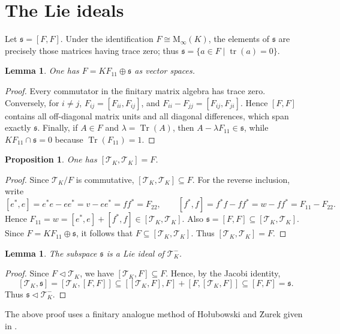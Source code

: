 \documentclass[11pt]{article}
\numberwithin{equation}{section}
\theoremstyle{plain}
\newtheorem{lemma}[theorem]{Lemma}
\newtheorem{proposition}[theorem]{Proposition}
\theoremstyle{definition}
\numberwithin{equation}{section}
\newcommand{\T}{\mathscr T_K}
\newcommand{\tr}{\operatorname{Tr}}
\begin{document}
\section{The Lie ideals}
Let $\mathfrak s=[F,F]$. Under the identification $F\cong\mathrm M_\infty(K)$, the elements of $\mathfrak s$ are precisely those matrices having trace zero; thus $\mathfrak s=\{a\in F\mid \operatorname{tr}(a)=0\}$.

\begin{lemma}\label{lem:s-trace-zero}
One has $F=KF_{11}\oplus\mathfrak s$ as vector spaces.
\end{lemma}

\begin{proof}
Every commutator in the finitary matrix algebra has trace zero. Conversely, for $i\neq j$, $F_{ij}=[F_{ii},F_{ij}]$, and $F_{ii}-F_{jj}=[F_{ij},F_{ji}]$. Hence $[F,F]$ contains all off-diagonal matrix units and all diagonal differences, which span exactly $\mathfrak s$. Finally, if $A\in F$ and $\lambda=\tr(A)$, then $A-\lambda F_{11}\in\mathfrak s$, while $KF_{11}\cap\mathfrak s=0$ because $\tr(F_{11})=1$.
\end{proof}

\begin{proposition}\label{prop:derived}
One has $[\T,\T]=F$.
\end{proposition}

\begin{proof}
Since $\T/F$ is commutative, $[\T,\T]\subseteq F$. For the reverse inclusion, write
$$
[e^*,e]=e^* e-e e^*=v-e e^*=f f^*=F_{22},
\qquad
[f^*,f]=f^* f-f f^*=w-f f^*=F_{11}-F_{22}.
$$
Hence $F_{11}=w=[e^*,e]+[f^*,f]\in[\T,\T]$. Also $\mathfrak s=[F,F]\subseteq[\T,\T]$. Since $F=KF_{11}\oplus\mathfrak s$, it follows that $F\subseteq[\T,\T]$. Thus $[\T,\T]=F$.
\end{proof}



\begin{lemma}\label{lem:s-ideal}
The subspace $\mathfrak s$ is a Lie ideal of $\T^-$.
\end{lemma}

\begin{proof}
Since $F\triangleleft\T$, we have $[\T,F]\subseteq F$. Hence, by the Jacobi identity,
$$
[\T,\mathfrak s]=[\T,[F,F]]
\subseteq [[\T,F],F]+[F,[\T,F]]
\subseteq [F,F]=\mathfrak s.
$$
Thus $\mathfrak s\triangleleft\T^-$.
\end{proof}


The above proof uses a finitary analogue method of Ho\l{}ubowski and \u{Z}urek given in \cite[Section~2]{HolubowskiZurek}.
\end{document}
